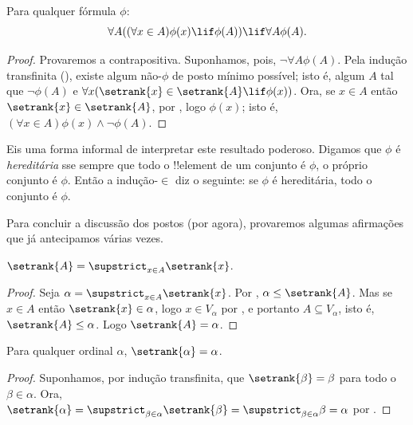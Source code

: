 \documentclass[../../../include/open-logic-section]{subfiles}
\begin{document}
\begin{thm} 
Para qualquer fórmula $\phi$:
\[
	\forall A((\forall x \in A)\phi(x) \lif \phi(A)) \lif \forall A \phi(A).
\]
\end{thm}

\begin{proof}
Provaremos a contrapositiva. Suponhamos, pois, $\lnot \forall A
\phi(A)$. Pela indução transfinita
(), existe
algum não-$\phi$ de posto mínimo possível; isto é, algum $A$
tal que $\lnot \phi(A)$ e $\forall x(\setrank{x} \in \setrank{A}
\lif \phi(x))$. Ora, se $x \in A$ então $\setrank{x} \in
\setrank{A}$, por , logo $\phi(x)$; isto é, $(\forall x \in
A)\phi(x) \land \lnot \phi(A)$.
\end{proof}\noindent Eis uma forma informal de interpretar este resultado
poderoso. Digamos que $\phi$ é \emph{hereditária} sse sempre que todo o
!!{element} de um conjunto é $\phi$, o próprio conjunto é $\phi$. Então
a indução-$\in$ diz o seguinte: se $\phi$ é hereditária,
todo o conjunto é $\phi$.

Para concluir a discussão dos postos (por agora), provaremos algumas
afirmações que já antecipamos várias vezes. 

\begin{prop}
$\setrank{A} = \supstrict_{x \in A}\setrank{x}$.
\end{prop}

\begin{proof}
Seja $\alpha = \supstrict_{x \in A}\setrank{x}$. Por
, $\alpha \leq \setrank{A}$. Mas se $x \in A$
então $\setrank{x} \in \alpha$, logo $x \in V_\alpha$ por , e portanto $A
\subseteq V_\alpha$, isto é, $\setrank{A} \leq \alpha$. Logo
$\setrank{A} = \alpha$.
\end{proof}

\begin{cor}
Para qualquer ordinal $\alpha$, $\setrank{\alpha} = \alpha$.
\end{cor}

\begin{proof}
Suponhamos, por indução transfinita, que $\setrank{\beta} = \beta$ para
todo o $\beta \in \alpha$. Ora, $\setrank{\alpha} = \supstrict_{\beta \in
\alpha}\setrank{\beta} = \supstrict_{\beta \in \alpha}\beta = \alpha$
por .
%
\end{proof}
\end{document}

